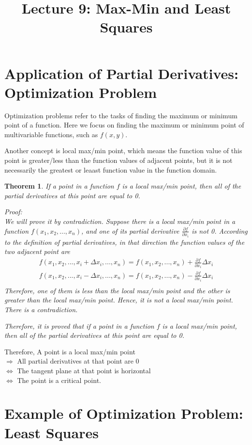 \documentclass{article}
\title{Lecture 9: Max-Min and Least Squares}
\author{}
\date{}
\newtheorem*{theorem}{Theorem}
\begin{document}
    
\maketitle

\section{Application of Partial Derivatives: Optimization Problem}

Optimization problems refer to the tasks of finding the maximum or minimum point 
of a function. Here we focus on finding the maximum or minimum point of 
multivariable functions, such as $f(x, y)$.

Another concept is local max/min point, which means the function value of this 
point is greater/less than the function values of adjacent points, but it is not 
necessarily the greatest or leaast function value in the function domain.

\begin{theorem}
  If a point in a function $f$ is a local max/min point, then all of the partial 
  derivatives at this point are equal to 0.

  Proof: \\
  We will prove it by contradiction. Suppose there is a local max/min point in a 
  function $f(x_1, x_2, ..., x_n)$, and one of its partial derivative 
  $\frac{\partial f}{\partial x_i}$ is not 0. According to the definition of 
  partial derivatives, in that direction the function values of the two adjacent 
  point are 
  \begin{gather*}
    f(x_1, x_2, ..., x_i + \Delta x_i, ..., x_n) = f(x_1, x_2, ..., x_n) + \frac{\partial f}{\partial x_i} \Delta x_i \\
    f(x_1, x_2, ..., x_i - \Delta x_i, ..., x_n) = f(x_1, x_2, ..., x_n) - \frac{\partial f}{\partial x_i} \Delta x_i \\
  \end{gather*}
  Therefore, one of them is less than the local max/min point and the other is 
  greater than the local max/min point. Hence, it is not a local max/min point.
  There is a contradiction.

  Therefore, it is proved that if a point in a function $f$ is a local max/min 
  point, then all of the partial derivatives at this point are equal to 0.
\end{theorem}

Therefore, A point is a local max/min point \\
$\Rightarrow$ All partial derivatives at that point are 0 \\
$\iff$ The tangent plane at that point is horizontal \\
$\iff$ The point is a critical point.

\section{Example of Optimization Problem: Least Squares}
\end{document}
